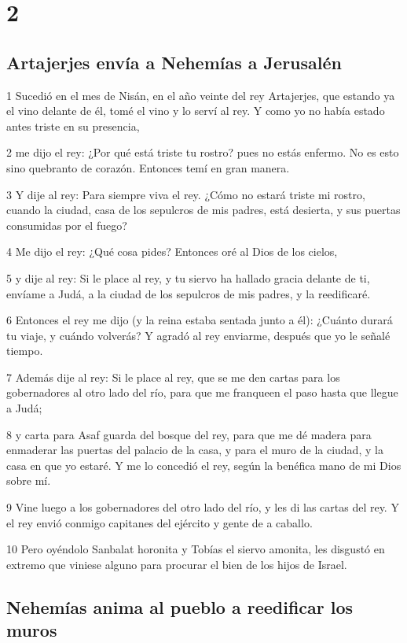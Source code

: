 \chapter{2}

\section*{Artajerjes envía a Nehemías a Jerusalén}

\par 1 Sucedió en el mes de Nisán, en el año veinte del rey Artajerjes, que estando ya el vino delante de él, tomé el vino y lo serví al rey. Y como yo no había estado antes triste en su presencia,
\par 2 me dijo el rey: ¿Por qué está triste tu rostro? pues no estás enfermo. No es esto sino quebranto de corazón. Entonces temí en gran manera.
\par 3 Y dije al rey: Para siempre viva el rey. ¿Cómo no estará triste mi rostro, cuando la ciudad, casa de los sepulcros de mis padres, está desierta, y sus puertas consumidas por el fuego? 
\par 4 Me dijo el rey: ¿Qué cosa pides? Entonces oré al Dios de los cielos,
\par 5 y dije al rey: Si le place al rey, y tu siervo ha hallado gracia delante de ti, envíame a Judá, a la ciudad de los sepulcros de mis padres, y la reedificaré.
\par 6 Entonces el rey me dijo (y la reina estaba sentada junto a él): ¿Cuánto durará tu viaje, y cuándo volverás? Y agradó al rey enviarme, después que yo le señalé tiempo.
\par 7 Además dije al rey: Si le place al rey, que se me den cartas para los gobernadores al otro lado del río, para que me franqueen el paso hasta que llegue a Judá;
\par 8 y carta para Asaf guarda del bosque del rey, para que me dé madera para enmaderar las puertas del palacio de la casa, y para el muro de la ciudad, y la casa en que yo estaré. Y me lo concedió el rey, según la benéfica mano de mi Dios sobre mí.
\par 9 Vine luego a los gobernadores del otro lado del río, y les di las cartas del rey. Y el rey envió conmigo capitanes del ejército y gente de a caballo.
\par 10 Pero oyéndolo Sanbalat horonita y Tobías el siervo amonita, les disgustó en extremo que viniese alguno para procurar el bien de los hijos de Israel.

\section*{Nehemías anima al pueblo a reedificar los muros}

